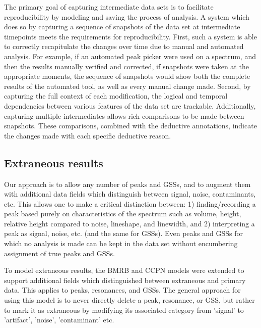 The primary goal of capturing intermediate data sets is to 
facilitate reproducibility by modeling and saving the process of analysis.  
A system which does so by capturing a sequence of snapshots of the data set 
at intermediate timepoints meets the requirements for reproducibility.
First, such a system is able to correctly recapitulate the changes over time
due to manual and automated analysis.  For example,
if an automated peak picker were used on a spectrum, and then the results
manually verified and corrected, if snapshots were taken at the appropriate
moments, the sequence of snapshots would show both the complete results of
the automated tool, as well as every manual change made.
Second, by capturing the full context of each modification, the logical and 
temporal dependencies between various features of the data set are trackable.
Additionally, capturing multiple intermediates allows rich comparisons to be made 
between snapshots.  These comparisons, combined with the deductive annotations,
indicate the changes made with each specific deductive reason. 


\subsection*{Extraneous results}
Our approach is to allow any number of peaks and GSSs, and to 
augment them with additional data fields which distinguish between signal, 
noise, contaminants, etc.  This allows one to make a critical distinction 
between: 1) finding/recording a peak based purely on characteristics of 
the spectrum such as volume, height, relative height compared to noise, 
lineshape, and linewidth, and 2) interpreting a peak as signal, noise, 
etc. (and the same for GSSs).  Even peaks and GSSs for 
which no analysis is made can be kept in the data set without encumbering 
assignment of true peaks and GSSs.

To model extraneous results, the BMRB and CCPN models \cite{bmrb, ccpn}
were extended to support additional fields which distinguished between 
extraneous and primary data.
This applies to peaks, resonances, and GSSs.
The general approach for using this model is to never directly delete
a peak, resonance, or GSS, but rather to mark it as extraneous by modifying
its associated category from 'signal' to 'artifact', 'noise', 'contaminant'
etc.

